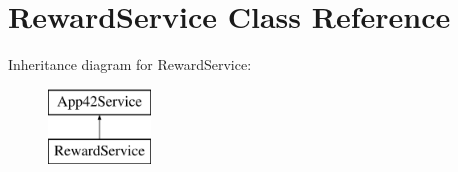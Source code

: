 \hypertarget{class_reward_service}{\section{Reward\+Service Class Reference}
\label{class_reward_service}
}
Inheritance diagram for Reward\+Service\+:\begin{figure}[H]
\begin{center}
\leavevmode
\includegraphics[height=2.000000cm]{class_reward_service}
\end{center}
\end{figure}
